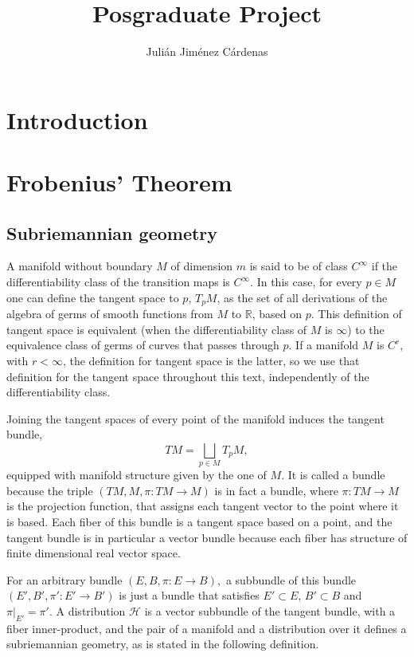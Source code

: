 \documentclass[12pt, letterpaper, reqno]{amsart}
\author{Julián Jiménez Cárdenas}
\title[Posgraduate Project]{Posgraduate Project}
\theoremstyle{definition}
\theoremstyle{plain}
\theoremstyle{remark}
\begin{document}
\maketitle

\begin{abstract}
\end{abstract}

\section*{Introduction}
\label{sec:0}


\section{Frobenius' Theorem}
\label{sec:1}

\subsection{Subriemannian geometry}%
\label{sub:subriemannian_geometry}


A manifold without boundary $M$ of dimension $ m $  is said to be of class $ C^\infty $ if the differentiability class of the transition maps is $C^\infty.$ In this case, for every $ p\in M $ one can define the tangent space to $ p $, $ T_pM $, as the set of all derivations of the algebra of germs of smooth functions from $ M $ to $ \mathbb{R}  $,  based on $ p $. This definition of tangent space is equivalent (when the differentiability class of $ M $ is $ \infty $) to the equivalence class of germs of curves that passes through $ p $. If a manifold $ M $  is $C^r$, with $r< \infty$, the definition for tangent space is the latter, so we use that definition for the tangent space throughout this text, independently of the differentiability class.

Joining the tangent spaces of every point of the manifold induces the tangent bundle,
$$ TM = \bigsqcup_{p\in M} T_pM, $$ 
equipped with manifold structure given by the one of $ M. $ It is called a bundle because the triple $ (TM, M,\pi:TM \rightarrow {M}) $ is in fact a bundle, where $ \pi:TM \rightarrow {M} $  is the projection function, that assigns each tangent vector to the point where it is based. Each fiber of this bundle is a tangent space based on a point, and the tangent bundle is in particular a vector bundle because each fiber has structure of finite dimensional real vector space. 

For an arbitrary bundle $ (E,B,\pi:E \rightarrow {B}), $ a subbundle of this bundle $ (E',B',\pi':E' \rightarrow {B'}) $  is just a bundle that satisfies $ E'\subset E $, $ B'\subset B $ and $ \pi|_{E'}=\pi'. $ A distribution $ \mathcal{H} $ is a vector subbundle of the tangent bundle, with a fiber inner-product, and the pair of a manifold and a distribution over it defines a subriemannian geometry, as is stated in the following definition.
\end{document}
